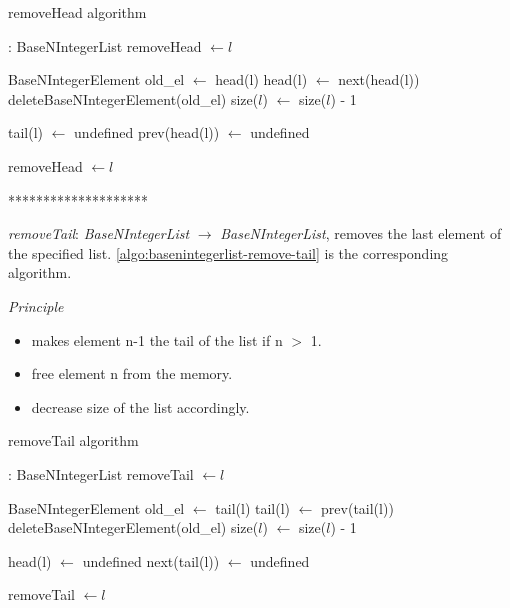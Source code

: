 \documentclass[book, nodocumentinfo]{upmethodology-document}
\newcommand{\separator}{\centerline{********************}}
\begin{document}
\begin{algorithm}[H]
    \caption{removeHead algorithm}
    \label{algo:basenintegerlist-remove-head}

    \begin{algorithmic}
         : BaseNIntegerList
                \State removeHead \(\leftarrow l\)
            \EndIf

            \State BaseNIntegerElement old\_el \(\leftarrow\) head(l)
            \State head(l) \(\leftarrow\) next(head(l))
            \State deleteBaseNIntegerElement(old\_el)
            \State size(\(l\)) \(\leftarrow\) size(\(l\)) - 1

                \State tail(l) \(\leftarrow\) undefined
            \Else
                \State prev(head(l)) \(\leftarrow\) undefined
            \EndIf

            \State removeHead \(\leftarrow l\)
        \EndFunction
    \end{algorithmic}
\end{algorithm}

\separator

\emph{removeTail}: \emph{BaseNIntegerList} \(\rightarrow\) \emph{BaseNIntegerList},
removes the last element of the specified list.
\ref{algo:basenintegerlist-remove-tail} is the corresponding algorithm.

\emph{Principle}
\begin{itemize}
    \item makes element n-1 the tail of the list if n \(>\) 1.
    \item free element n from the memory.
    \item decrease size of the list accordingly.
\end{itemize}

\begin{algorithm}[H]
    \caption{removeTail algorithm}
    \label{algo:basenintegerlist-remove-tail}

    \begin{algorithmic}
         : BaseNIntegerList
                \State removeTail \(\leftarrow l\)
            \EndIf

            \State BaseNIntegerElement old\_el \(\leftarrow\) tail(l)
            \State tail(l) \(\leftarrow\) prev(tail(l))
            \State deleteBaseNIntegerElement(old\_el)
            \State size(\(l\)) \(\leftarrow\) size(\(l\)) - 1

                \State head(l) \(\leftarrow\) undefined
            \Else
                \State next(tail(l)) \(\leftarrow\) undefined
            \EndIf

            \State removeTail \(\leftarrow l\)
        \EndFunction
    \end{algorithmic}
\end{algorithm}
\end{document}
